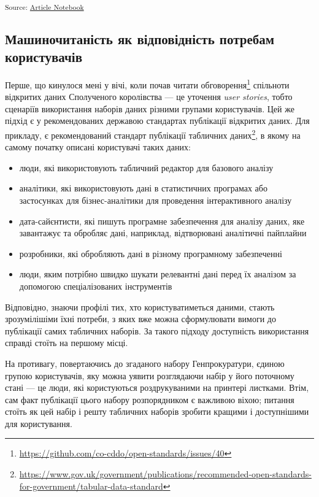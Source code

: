 \documentclass[
]{agujournal2019}
\providecommand{\tightlist}{%
  \setlength{\itemsep}{0pt}\setlength{\parskip}{0pt}}\usepackage{longtable,booktabs,array}
\begin{document}
\textsubscript{Source:
\href{https://mykuzin.github.io/machine-readability-and-open-data/index.qmd.html}{Article
Notebook}}

\subsection{Машиночитаність як відповідність потребам
користувачів}\label{sec-data-methods}

Перше, що кинулося мені у вічі, коли почав читати обговорення\footnote{\url{https://github.com/co-cddo/open-standards/issues/40}}
спільноти відкритих даних Сполученого королівства --- це уточення
\emph{user stories}, тобто сценаріїв використання наборів даних різними
групами користувачів. Цей же підхід є у рекомендованих державою
стандартах публікації відкритих даних. Для прикладу, є рекомендований
стандарт публікації табличних даних\footnote{\url{https://www.gov.uk/government/publications/recommended-open-standards-for-government/tabular-data-standard}},
в якому на самому початку описані користувачі таких даних:

\begin{itemize}
\tightlist
\item
  люди, які використовують табличний редактор для базового аналізу
\item
  аналітики, які використовують дані в статистичних програмах або
  застосунках для бізнес-аналітики для проведення інтерактивного аналізу
\item
  дата-сайєнтисти, які пишуть програмне забезпечення для аналізу даних,
  яке завантажує та обробляє дані, наприклад, відтворювані аналітичні
  пайплайни
\item
  розробники, які обробляють дані в різному програмному забезпеченні
\item
  люди, яким потрібно швидко шукати релевантні дані перед їх аналізом за
  допомогою спеціалізованих інструментів
\end{itemize}

Відповідно, знаючи профілі тих, хто користуватиметься даними, стають
зрозумілішіми їхні потреби, з яких вже можна сформулювати вимоги до
публікації самих табличних наборів. За такого підходу доступність
використання справді стоїть на першому місці.

На противагу, повертаючись до згаданого набору Генпрокуратури, єдиною
групою користувачів, яку можна уявити розглядаючи набір у його поточному
стані --- це люди, які користуються роздрукуваними на принтері листками.
Втім, сам факт публікації цього набору розпорядником є важливою віхою;
питання стоїть як цей набір і решту табличних наборів зробити кращими і
доступнішими для користування.
\end{document}
